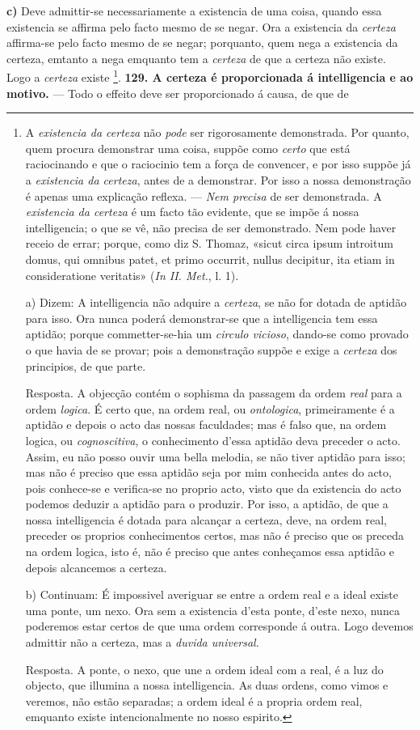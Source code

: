 \textbf{c)} Deve admittir-se necessariamente a existencia de uma coisa, quando essa existencia se affirma pelo facto mesmo de se negar. Ora a existencia da \emph{certeza} affirma-se pelo facto mesmo de se negar; porquanto, quem nega a existencia da certeza, emtanto a nega emquanto tem a \emph{certeza} de que a certeza não existe. Logo a \emph{certeza} existe \footnote{A \emph{existencia da certeza} não \emph{pode} ser rigorosamente demonstrada. Por quanto, quem procura demonstrar uma coisa, suppõe como \emph{certo} que está raciocinando e que o raciocinio tem a força de convencer, e por isso suppõe já a \emph{existencia da certeza}, antes de a demonstrar. Por isso a nossa demonstração é apenas uma explicação reflexa. --- \emph{Nem precisa} de ser demonstrada. A \emph{existencia da certeza} é um facto tão evidente, que se impõe á nossa intelligencia; o que se vê, não precisa de ser demonstrado. Nem pode haver receio de errar; porque, como diz S. Thomaz, «sicut circa ipsum introitum domus, qui omnibus patet, et primo occurrit, nullus decipitur, ita etiam in consideratione veritatis» (\emph{In II. Met.}, l. 1).\par a) Dizem: A intelligencia não adquire a \emph{certeza}, se não for dotada de aptidão para isso. Ora nunca poderá demonstrar-se que a intelligencia tem essa aptidão; porque commetter-se-hia um \emph{circulo vicioso}, dando-se como provado o que havia de se provar; pois a demonstração suppõe e exige a \emph{certeza} dos principios, de que parte.\par Resposta. A objecção contém o sophisma da passagem da ordem \emph{real} para a ordem \emph{logica}. É certo que, na ordem real, ou \emph{ontologica}, primeiramente é a aptidão e depois o acto das nossas faculdades; mas é falso que, na ordem logica, ou \emph{cognoscitiva}, o conhecimento d'essa aptidão deva preceder o acto. Assim, eu não posso ouvir uma bella melodia, se não tiver aptidão para isso; mas não é preciso que essa aptidão seja por mim conhecida antes do acto, pois conhece-se e verifica-se no proprio acto, visto que da existencia do acto podemos deduzir a aptidão para o produzir. Por isso, a aptidão, de que a nossa intelligencia é dotada para alcançar a certeza, deve, na ordem real, preceder os proprios conhecimentos certos, mas não é preciso que os preceda na ordem logica, isto é, não é preciso que antes conheçamos essa aptidão e depois alcancemos a certeza.\par b) Continuam: É impossivel averiguar se entre a ordem real e a ideal existe uma ponte, um nexo. Ora sem a existencia d'esta ponte, d'este nexo, nunca poderemos estar certos de que uma ordem corresponde á outra. Logo devemos admittir não a certeza, mas a \emph{duvida universal}.\par Resposta. A ponte, o nexo, que une a ordem ideal com a real, é a luz do objecto, que illumina a nossa intelligencia. As duas ordens, como vimos e veremos, não estão separadas; a ordem ideal é a propria ordem real, emquanto existe intencionalmente no nosso espirito.}. \textbf{129. A certeza é proporcionada á intelligencia e ao motivo.} --- Todo o effeito deve ser proporcionado á causa, de que de

